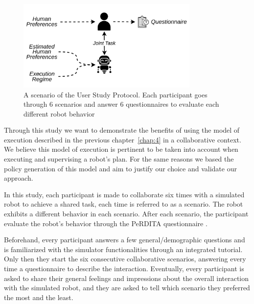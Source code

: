 \begin{figure}
    \centering
    \includegraphics[width=0.8\textwidth]{images/Chapter5/UserStudyProcedure.png}
    \caption{A scenario of the User Study Protocol. Each participant goes through 6 scenarios and answer 6 questionnaires to evaluate each different robot behavior}
    \label{fig:user_study_protocol}
\end{figure}




Through this study we want to demonstrate the benefits of using the model of execution described in the previous chapter~\ref{chap:4} in a collaborative context. We believe this model of execution is pertinent to be taken into account when executing and supervising a robot's plan. For the same reasons we based the policy generation of this model and aim to justify our choice and validate our approach.

In this study, each participant is made to collaborate six times with a simulated robot to achieve a shared task, each time is referred to as a scenario. The robot exhibits a different behavior in each scenario. After each scenario, the participant evaluate the robot's behavior through the PeRDITA questionnaire \cite{devin_evaluating_2018}.

Beforehand, every participant answers a few general/demographic questions and is familiarized with the simulator functionalities through an integrated tutorial. Only then they start the six consecutive collaborative scenarios, answering every time a questionnaire to describe the interaction. Eventually, every participant is asked to share their general feelings and impressions about the overall interaction with the simulated robot, and they are asked to tell which scenario they preferred the most and the least.


